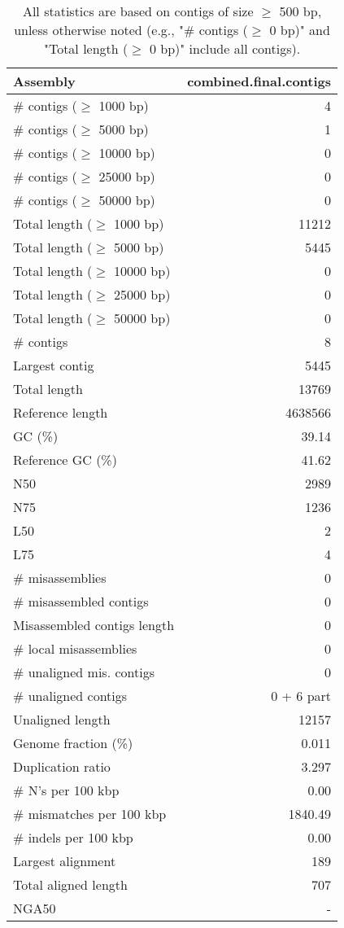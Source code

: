 \documentclass[12pt,a4paper]{article}
\begin{document}
\begin{table}[ht]
\begin{center}
\caption{All statistics are based on contigs of size $\geq$ 500 bp, unless otherwise noted (e.g., "\# contigs ($\geq$ 0 bp)" and "Total length ($\geq$ 0 bp)" include all contigs).}
\begin{tabular}{|l*{1}{|r}|}
\hline
Assembly & combined.final.contigs \\ \hline
\# contigs ($\geq$ 1000 bp) & 4 \\ \hline
\# contigs ($\geq$ 5000 bp) & 1 \\ \hline
\# contigs ($\geq$ 10000 bp) & 0 \\ \hline
\# contigs ($\geq$ 25000 bp) & 0 \\ \hline
\# contigs ($\geq$ 50000 bp) & 0 \\ \hline
Total length ($\geq$ 1000 bp) & 11212 \\ \hline
Total length ($\geq$ 5000 bp) & 5445 \\ \hline
Total length ($\geq$ 10000 bp) & 0 \\ \hline
Total length ($\geq$ 25000 bp) & 0 \\ \hline
Total length ($\geq$ 50000 bp) & 0 \\ \hline
\# contigs & 8 \\ \hline
Largest contig & 5445 \\ \hline
Total length & 13769 \\ \hline
Reference length & 4638566 \\ \hline
GC (\%) & 39.14 \\ \hline
Reference GC (\%) & 41.62 \\ \hline
N50 & 2989 \\ \hline
N75 & 1236 \\ \hline
L50 & 2 \\ \hline
L75 & 4 \\ \hline
\# misassemblies & 0 \\ \hline
\# misassembled contigs & 0 \\ \hline
Misassembled contigs length & 0 \\ \hline
\# local misassemblies & 0 \\ \hline
\# unaligned mis. contigs & 0 \\ \hline
\# unaligned contigs & 0 + 6 part \\ \hline
Unaligned length & 12157 \\ \hline
Genome fraction (\%) & 0.011 \\ \hline
Duplication ratio & 3.297 \\ \hline
\# N's per 100 kbp & 0.00 \\ \hline
\# mismatches per 100 kbp & 1840.49 \\ \hline
\# indels per 100 kbp & 0.00 \\ \hline
Largest alignment & 189 \\ \hline
Total aligned length & 707 \\ \hline
NGA50 & - \\ \hline
\end{tabular}
\end{center}
\end{table}
\end{document}
